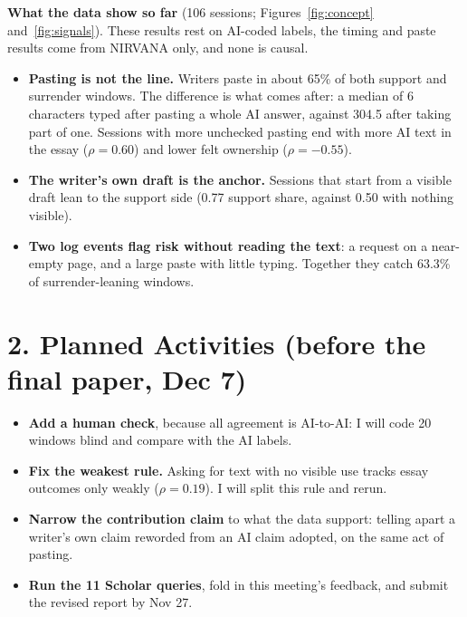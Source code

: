 \documentclass[11pt]{article}
\begin{document}
\textbf{What the data show so far} (106 sessions; Figures~\ref{fig:concept} and~\ref{fig:signals}). These results rest on AI-coded labels, the timing and paste results come from NIRVANA only, and none is causal.
\begin{itemize}
  \item \textbf{Pasting is not the line.} Writers paste in about 65\% of both support and surrender windows. The difference is what comes after: a median of 6 characters typed after pasting a whole AI answer, against 304.5 after taking part of one. Sessions with more unchecked pasting end with more AI text in the essay ($\rho = 0.60$) and lower felt ownership ($\rho = -0.55$).
  \item \textbf{The writer's own draft is the anchor.} Sessions that start from a visible draft lean to the support side (0.77 support share, against 0.50 with nothing visible).
  \item \textbf{Two log events flag risk without reading the text}: a request on a near-empty page, and a large paste with little typing. Together they catch 63.3\% of surrender-leaning windows.
\end{itemize}


\section{2. Planned Activities (before the final paper, Dec 7)}
\begin{itemize}
  \item \textbf{Add a human check}, because all agreement is AI-to-AI: I will code 20 windows blind and compare with the AI labels.
  \item \textbf{Fix the weakest rule.} Asking for text with no visible use tracks essay outcomes only weakly ($\rho = 0.19$). I will split this rule and rerun.
  \item \textbf{Narrow the contribution claim} to what the data support: telling apart a writer's own claim reworded from an AI claim adopted, on the same act of pasting.
  \item \textbf{Run the 11 Scholar queries}, fold in this meeting's feedback, and submit the revised report by Nov 27.
\end{itemize}
\end{document}
